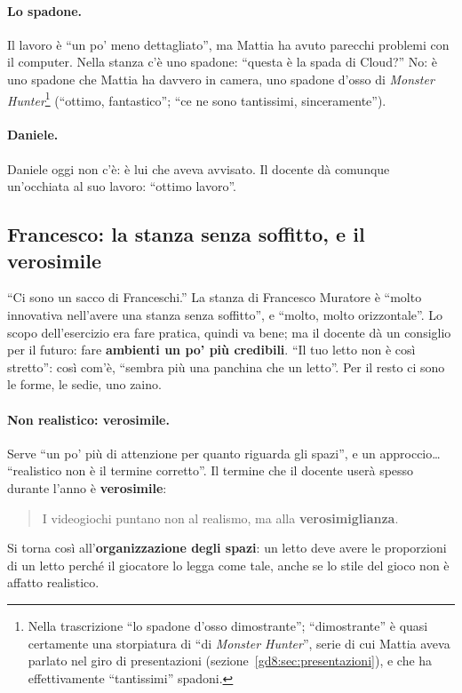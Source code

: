 \paragraph{Lo spadone.} Il lavoro è ``un po' meno dettagliato'', ma Mattia ha
avuto parecchi problemi con il computer. Nella stanza c'è uno spadone: ``questa
è la spada di Cloud?'' No: è uno spadone che Mattia ha davvero in camera, uno
spadone d'osso di \emph{Monster Hunter}\footnote{Nella trascrizione ``lo
spadone d'osso dimostrante''; ``dimostrante'' è quasi certamente una
storpiatura di ``di \emph{Monster Hunter}'', serie di cui Mattia aveva parlato
nel giro di presentazioni (sezione~\ref{gd8:sec:presentazioni}), e che ha
effettivamente ``tantissimi'' spadoni.} (``ottimo, fantastico''; ``ce ne sono
tantissimi, sinceramente'').

\paragraph{Daniele.} Daniele oggi non c'è: è lui che aveva avvisato. Il docente
dà comunque un'occhiata al suo lavoro: ``ottimo lavoro''.

\subsection{Francesco: la stanza senza soffitto, e il verosimile}

``Ci sono un sacco di Franceschi.'' La stanza di Francesco Muratore è ``molto
innovativa nell'avere una stanza senza soffitto'', e ``molto, molto
orizzontale''. Lo scopo dell'esercizio era fare pratica, quindi va bene; ma il
docente dà un consiglio per il futuro: fare \textbf{ambienti un po' più
credibili}. ``Il tuo letto non è così stretto'': così com'è, ``sembra più una
panchina che un letto''. Per il resto ci sono le forme, le sedie, uno zaino.

\paragraph{Non realistico: verosimile.} Serve ``un po' più di attenzione per
quanto riguarda gli spazi'', e un approccio\ldots{} ``realistico non è il
termine corretto''. Il termine che il docente userà spesso durante l'anno è
\textbf{verosimile}:
\begin{quote}
I videogiochi puntano non al realismo, ma alla \textbf{verosimiglianza}.
\end{quote}
Si torna così all'\textbf{organizzazione degli spazi}: un letto deve avere le
proporzioni di un letto perché il giocatore lo legga come tale, anche se lo
stile del gioco non è affatto realistico.

